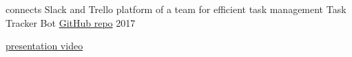 \begin{cventries}
    \cventry
    {connects Slack and Trello platform of a team for efficient task management}
    {Task Tracker Bot}
    {\href{https://github.ncsu.edu/yhu22/CSC510_F17_Project}{GitHub repo}}
    {2017}  
    {
    \begin{cvitems}
        \color{awesome-red}
        \href{https://www.youtube.com/watch?v=wMjgotF9bms}{presentation video}
    \end{cvitems}
    }
\end{cventries}
